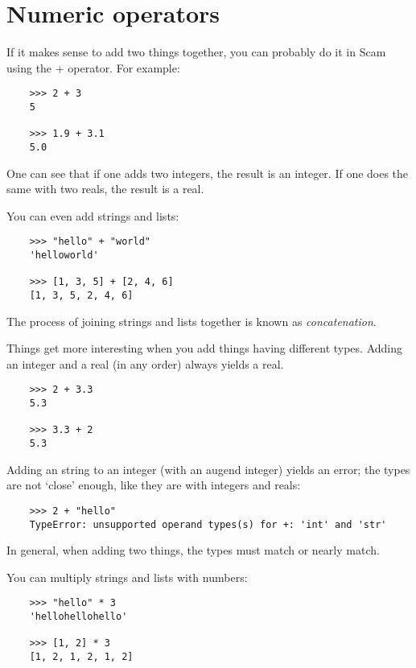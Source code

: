 \section{Numeric operators}

If it makes sense to add two things together, you can probably do it in
Scam using the + operator. For example:

\begin{verbatim}
    >>> 2 + 3
    5
    
    >>> 1.9 + 3.1 
    5.0
\end{verbatim}
    
One can see that if one adds two integers, the result is an integer. If
one does the same with two reals, the result is a real.

You can even add strings and lists:

\begin{verbatim}
    >>> "hello" + "world"
    'helloworld'

    >>> [1, 3, 5] + [2, 4, 6]
    [1, 3, 5, 2, 4, 6]
\end{verbatim}

The process of joining strings and lists together is known as
{\it concatenation}.

Things get more interesting when
you add things having different types. Adding an integer and a real (in
any order) always yields a real.

\begin{verbatim}
    >>> 2 + 3.3
    5.3
    
    >>> 3.3 + 2
    5.3
\end{verbatim}
    
Adding an string to an integer
(with an augend integer) yields an error;
the types are not `close' enough, like they are with
integers and reals:

\begin{verbatim}
    >>> 2 + "hello"
    TypeError: unsupported operand types(s) for +: 'int' and 'str'
\end{verbatim}

In general, when adding two things,
the types must match or nearly match.
    
You can multiply strings and lists with numbers:

\begin{verbatim}
    >>> "hello" * 3
    'hellohellohello'

    >>> [1, 2] * 3
    [1, 2, 1, 2, 1, 2]
\end{verbatim}

